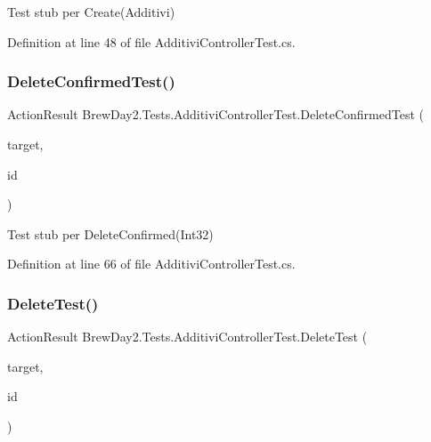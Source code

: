Test stub per Create(\+Additivi)



Definition at line 48 of file Additivi\+Controller\+Test.\+cs.

\mbox{\label{class_brew_day2_1_1_tests_1_1_additivi_controller_test_adcd54e671aa425c1f7863a99ec0339ac}} 
\subsubsection{\texorpdfstring{Delete\+Confirmed\+Test()}{DeleteConfirmedTest()}}
{\footnotesize\ttfamily Action\+Result Brew\+Day2.\+Tests.\+Additivi\+Controller\+Test.\+Delete\+Confirmed\+Test (\begin{DoxyParamCaption}\item[{\mbox{[}\+Pex\+Assume\+Under\+Test\mbox{]} \mbox{\hyperlink{class_brew_day2_1_1_controllers_1_1_additivi_controller}{Additivi\+Controller}}}]{target,  }\item[{int}]{id }\end{DoxyParamCaption})}



Test stub per Delete\+Confirmed(\+Int32)



Definition at line 66 of file Additivi\+Controller\+Test.\+cs.

\mbox{\label{class_brew_day2_1_1_tests_1_1_additivi_controller_test_a00b7debb47483c49027e9a64b4bed1f7}} 
\subsubsection{\texorpdfstring{Delete\+Test()}{DeleteTest()}}
{\footnotesize\ttfamily Action\+Result Brew\+Day2.\+Tests.\+Additivi\+Controller\+Test.\+Delete\+Test (\begin{DoxyParamCaption}\item[{\mbox{[}\+Pex\+Assume\+Under\+Test\mbox{]} \mbox{\hyperlink{class_brew_day2_1_1_controllers_1_1_additivi_controller}{Additivi\+Controller}}}]{target,  }\item[{int?}]{id }\end{DoxyParamCaption})}



